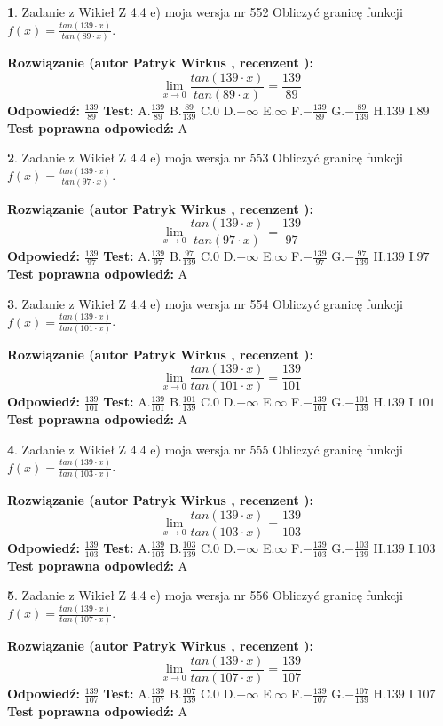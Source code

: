 \documentclass[12pt, a4paper]{article}
\theoremstyle{definition} %
\newtheorem{zad}{}
\newcommand{\zadStart}[1]{\begin{zad}#1\newline}
\newcommand{\zadStop}{\end{zad}}
\newcommand{\rozwStart}[2]{\noindent \textbf{Rozwiązanie (autor #1 , recenzent #2): }\newline}
\newcommand{\rozwStop}{\newline}
\newcommand{\odpStart}{\noindent \textbf{Odpowiedź:}\newline}
\newcommand{\odpStop}{\newline}
\newcommand{\testStart}{\noindent \textbf{Test:}\newline}
\newcommand{\testStop}{\newline}
\newcommand{\kluczStart}{\noindent \textbf{Test poprawna odpowiedź:}\newline}
\newcommand{\kluczStop}{\newline}
\begin{document}
\zadStart{Zadanie z Wikieł Z 4.4 e) moja wersja nr 552}
Obliczyć granicę funkcji $f(x)=\frac{tan(139\cdot x)}{tan(89\cdot x)}$.
\zadStop
\rozwStart{Patryk Wirkus}{}
$$\lim\limits_{x\to 0}\frac{tan(139\cdot x)}{tan(89\cdot x)}=
\frac{139}{89}$$
\rozwStop
\odpStart
$\frac{139}{89}$
\odpStop
\testStart
A.$\frac{139}{89}$
B.$\frac{89}{139}$
C.$0$
D.$-\infty$
E.$\infty$
F.$-\frac{139}{89}$
G.$-\frac{89}{139}$
H.$139$
I.$89$
\testStop
\kluczStart
A
\kluczStop



\zadStart{Zadanie z Wikieł Z 4.4 e) moja wersja nr 553}
Obliczyć granicę funkcji $f(x)=\frac{tan(139\cdot x)}{tan(97\cdot x)}$.
\zadStop
\rozwStart{Patryk Wirkus}{}
$$\lim\limits_{x\to 0}\frac{tan(139\cdot x)}{tan(97\cdot x)}=
\frac{139}{97}$$
\rozwStop
\odpStart
$\frac{139}{97}$
\odpStop
\testStart
A.$\frac{139}{97}$
B.$\frac{97}{139}$
C.$0$
D.$-\infty$
E.$\infty$
F.$-\frac{139}{97}$
G.$-\frac{97}{139}$
H.$139$
I.$97$
\testStop
\kluczStart
A
\kluczStop



\zadStart{Zadanie z Wikieł Z 4.4 e) moja wersja nr 554}
Obliczyć granicę funkcji $f(x)=\frac{tan(139\cdot x)}{tan(101\cdot x)}$.
\zadStop
\rozwStart{Patryk Wirkus}{}
$$\lim\limits_{x\to 0}\frac{tan(139\cdot x)}{tan(101\cdot x)}=
\frac{139}{101}$$
\rozwStop
\odpStart
$\frac{139}{101}$
\odpStop
\testStart
A.$\frac{139}{101}$
B.$\frac{101}{139}$
C.$0$
D.$-\infty$
E.$\infty$
F.$-\frac{139}{101}$
G.$-\frac{101}{139}$
H.$139$
I.$101$
\testStop
\kluczStart
A
\kluczStop



\zadStart{Zadanie z Wikieł Z 4.4 e) moja wersja nr 555}
Obliczyć granicę funkcji $f(x)=\frac{tan(139\cdot x)}{tan(103\cdot x)}$.
\zadStop
\rozwStart{Patryk Wirkus}{}
$$\lim\limits_{x\to 0}\frac{tan(139\cdot x)}{tan(103\cdot x)}=
\frac{139}{103}$$
\rozwStop
\odpStart
$\frac{139}{103}$
\odpStop
\testStart
A.$\frac{139}{103}$
B.$\frac{103}{139}$
C.$0$
D.$-\infty$
E.$\infty$
F.$-\frac{139}{103}$
G.$-\frac{103}{139}$
H.$139$
I.$103$
\testStop
\kluczStart
A
\kluczStop



\zadStart{Zadanie z Wikieł Z 4.4 e) moja wersja nr 556}
Obliczyć granicę funkcji $f(x)=\frac{tan(139\cdot x)}{tan(107\cdot x)}$.
\zadStop
\rozwStart{Patryk Wirkus}{}
$$\lim\limits_{x\to 0}\frac{tan(139\cdot x)}{tan(107\cdot x)}=
\frac{139}{107}$$
\rozwStop
\odpStart
$\frac{139}{107}$
\odpStop
\testStart
A.$\frac{139}{107}$
B.$\frac{107}{139}$
C.$0$
D.$-\infty$
E.$\infty$
F.$-\frac{139}{107}$
G.$-\frac{107}{139}$
H.$139$
I.$107$
\testStop
\kluczStart
A
\kluczStop
\end{document}
